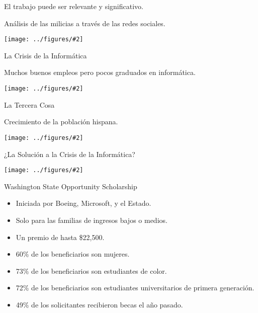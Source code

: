 \documentclass{beamer}
\newcommand{\fig}[2]{
  \texttt{[image: ../figures/\#2]}
}
\begin{document}
\begin{centering}
\begin{frame}[fragile]{El trabajo puede ser relevante y significativo.}
  
  {Análisis de las milicias a través de las redes sociales.}
  
  
  \vfill
  
  \fig{1.0}{saiph}
  
  
  
\end{frame}

\begin{frame}[fragile]{La Crisis de la Informática}
  
  {Muchos buenos empleos pero pocos graduados en informática.}
  
  \vfill
  
 \fig{1.0}{washington-jobs-vs-grads}
  
\end{frame}

\begin{frame}[fragile]{La Tercera Cosa}
  \pause
  
  Crecimiento de la población hispana.
  \vfill
  \fig{1.0}{hispanicpopgrowth}
\end{frame}


\begin{frame}[fragile]{¿La Solución a la Crisis de la Informática?}
  \pause
  

  
  \fig{1.0}{whitesdominate}
\end{frame}


\begin{frame}[fragile]{Washington State Opportunity Scholarship}


  \begin{itemize}
  \item Iniciada por Boeing, Microsoft, y el Estado.
  \item Solo para las familias de ingresos  bajos o medios.
  \item Un premio de hasta \$22,500.
  \item 60\% de los beneficiarios son mujeres.
  \item 73\% de los beneficiarios  son estudiantes de color.
  \item 72\% de los beneficiarios son estudiantes universitarios de primera generación.
  \item 49\% de los solicitantes recibieron becas el año pasado.
  \end{itemize}


\end{frame}
\end{centering}
\end{document}
